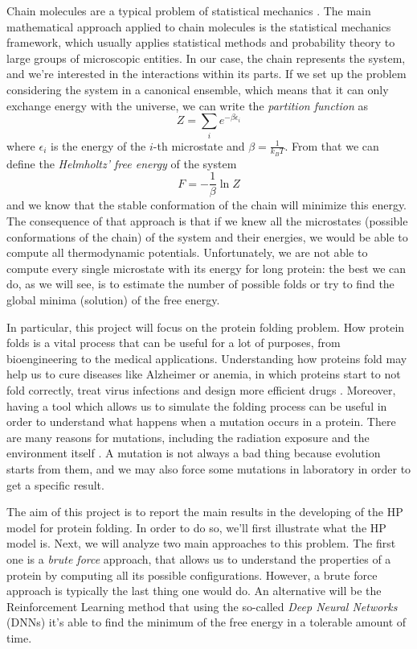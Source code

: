 Chain molecules are a typical problem of statistical mechanics \cite{statisticalmechanics}.
The main mathematical approach applied to chain molecules is the statistical mechanics framework, which usually applies statistical methods and probability theory to large groups of microscopic entities.
In our case, the chain represents the system, and we're interested in the interactions within its parts.
If we set up the problem considering the system in a canonical ensemble, which means that it can only exchange energy with the universe, we can write the \emph{partition function} as
\begin{equation*}
    Z = \sum_i e^{-\beta\epsilon_i}
\end{equation*}
where $\epsilon_i$ is the energy of the $i$-th microstate and $\beta = \frac{1}{k_BT}$.
From that we can define the \emph{Helmholtz' free energy} of the system
\begin{equation*}
    F = -\frac{1}{\beta} \ln Z
\end{equation*}
and we know that the stable conformation of the chain will minimize this energy.
The consequence of that approach is that if we knew all the microstates (possible conformations of the chain) of the system and their energies, we would be able to compute all thermodynamic potentials.
Unfortunately, we are not able to compute every single microstate with its energy for long protein: the best we can do, as we will see, is to estimate the number of possible folds or try to find the global minima (solution) of the free energy.

In particular, this project will focus on the protein folding problem.
How protein folds is a vital process that can be useful for a lot of purposes, from bioengineering to the medical applications.
Understanding how proteins fold may help us to cure diseases like Alzheimer or anemia, in which proteins start to not fold correctly, treat virus infections and design more efficient drugs \cite{PERM}. 
Moreover, having a tool which allows us to simulate the folding process can be useful in order to understand what happens when a mutation occurs in a protein.
There are many reasons for mutations, including the radiation exposure and the environment itself \cite{zanichelli}. A mutation is not always a bad thing because evolution starts from them, and we may also force some mutations in laboratory in order to get a specific result.

The aim of this project is to report the main results in the developing of the HP model for protein folding.
In order to do so, we'll first illustrate what the HP model is.
Next, we will analyze two main approaches to this problem.
The first one is a \emph{brute force} approach, that allows us to understand the properties of a protein by computing all its possible configurations.
However, a brute force approach is typically the last thing one would do.
An alternative will be the Reinforcement Learning method that using the so-called \emph{Deep Neural Networks} (DNNs) it's able to find the minimum of the free energy in a tolerable amount of time.
